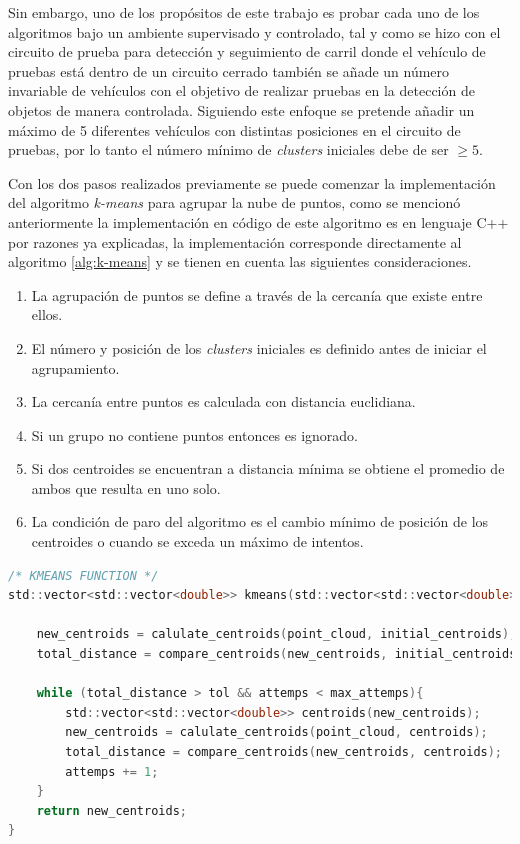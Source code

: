 Sin embargo, uno de los propósitos de este trabajo es probar cada uno de los algoritmos bajo un ambiente supervisado y controlado, tal y como se hizo con el circuito de prueba para detección y seguimiento de carril donde el vehículo de pruebas está dentro de un circuito cerrado también se añade un número invariable de vehículos con el objetivo de realizar pruebas en la detección de objetos de manera controlada.  Siguiendo este enfoque se pretende añadir un máximo de 5 diferentes vehículos con distintas posiciones en el circuito de pruebas, por lo tanto el número mínimo de \textit{clusters} iniciales debe de ser $\geq 5$.
\newpage

Con los dos pasos realizados previamente se puede comenzar la implementación del algoritmo \textit{k-means} para agrupar la nube de puntos, como se mencionó anteriormente la implementación en código de este algoritmo es en lenguaje C++ por razones ya explicadas, la implementación corresponde directamente al algoritmo \ref{alg:k-means} y se tienen en cuenta las siguientes consideraciones.
\begin{enumerate}
    \item La agrupación de puntos se define a través de la cercanía que existe entre ellos.
    \item El número y posición de los \textit{clusters} iniciales es definido antes de iniciar el agrupamiento.
    \item La cercanía entre puntos es calculada con distancia euclidiana.
    \item Si un grupo no contiene puntos entonces es ignorado.
    \item Si dos centroides se encuentran a distancia mínima se obtiene el promedio de ambos que resulta en uno solo.
    \item La condición de paro del algoritmo es el cambio mínimo de posición de los centroides o cuando se exceda un máximo de intentos.
\end{enumerate}

\begin{lstlisting}[language=C]
/* KMEANS FUNCTION */
std::vector<std::vector<double>> kmeans(std::vector<std::vector<double>> point_cloud){

    new_centroids = calulate_centroids(point_cloud, initial_centroids);        
    total_distance = compare_centroids(new_centroids, initial_centroids);      

    while (total_distance > tol && attemps < max_attemps){
        std::vector<std::vector<double>> centroids(new_centroids); 
        new_centroids = calulate_centroids(point_cloud, centroids); 
        total_distance = compare_centroids(new_centroids, centroids);
        attemps += 1;
    }
    return new_centroids;                                            
}
\end{lstlisting}
\hfill

